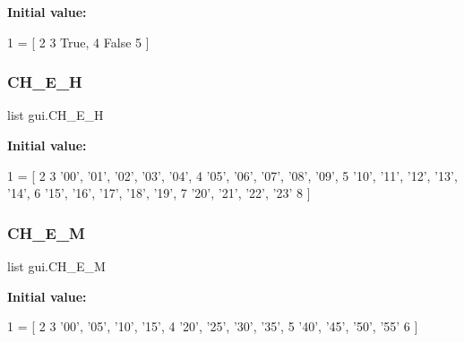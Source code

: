{\bfseries Initial value\+:}
\begin{DoxyCode}
1 =  [
2     
3     \textcolor{keyword}{True},
4     \textcolor{keyword}{False}
5 ]
\end{DoxyCode}
\mbox{\label{namespacegui_a630b1c9a262c2db79be3241a306996db_a630b1c9a262c2db79be3241a306996db}} 
\subsubsection{\texorpdfstring{C\+H\+\_\+\+E\+\_\+H}{CH\_E\_H}}
{\footnotesize\ttfamily list gui.\+C\+H\+\_\+\+E\+\_\+H}

{\bfseries Initial value\+:}
\begin{DoxyCode}
1 =  [
2     
3     \textcolor{stringliteral}{'00'}, \textcolor{stringliteral}{'01'}, \textcolor{stringliteral}{'02'}, \textcolor{stringliteral}{'03'}, \textcolor{stringliteral}{'04'}, 
4     \textcolor{stringliteral}{'05'}, \textcolor{stringliteral}{'06'}, \textcolor{stringliteral}{'07'}, \textcolor{stringliteral}{'08'}, \textcolor{stringliteral}{'09'}, 
5     \textcolor{stringliteral}{'10'}, \textcolor{stringliteral}{'11'}, \textcolor{stringliteral}{'12'}, \textcolor{stringliteral}{'13'}, \textcolor{stringliteral}{'14'}, 
6     \textcolor{stringliteral}{'15'}, \textcolor{stringliteral}{'16'}, \textcolor{stringliteral}{'17'}, \textcolor{stringliteral}{'18'}, \textcolor{stringliteral}{'19'}, 
7     \textcolor{stringliteral}{'20'}, \textcolor{stringliteral}{'21'}, \textcolor{stringliteral}{'22'}, \textcolor{stringliteral}{'23'}
8 ]
\end{DoxyCode}
\mbox{\label{namespacegui_ac490a15242fca7848bdcfbecc0d435d2_ac490a15242fca7848bdcfbecc0d435d2}} 
\subsubsection{\texorpdfstring{C\+H\+\_\+\+E\+\_\+M}{CH\_E\_M}}
{\footnotesize\ttfamily list gui.\+C\+H\+\_\+\+E\+\_\+M}

{\bfseries Initial value\+:}
\begin{DoxyCode}
1 =  [
2     
3     \textcolor{stringliteral}{'00'}, \textcolor{stringliteral}{'05'}, \textcolor{stringliteral}{'10'}, \textcolor{stringliteral}{'15'}, 
4     \textcolor{stringliteral}{'20'}, \textcolor{stringliteral}{'25'}, \textcolor{stringliteral}{'30'}, \textcolor{stringliteral}{'35'}, 
5     \textcolor{stringliteral}{'40'}, \textcolor{stringliteral}{'45'}, \textcolor{stringliteral}{'50'}, \textcolor{stringliteral}{'55'}
6 ]
\end{DoxyCode}
\mbox{\label{namespacegui_a20e2e6fa55b172992b7e4ff6823c012e_a20e2e6fa55b172992b7e4ff6823c012e}} 
